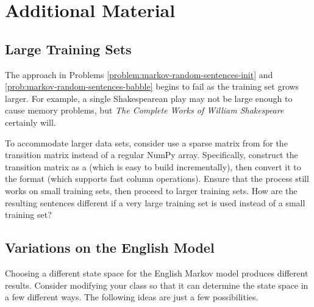 \newpage

\section*{Additional Material} %

\subsection*{Large Training Sets} %

The approach in Problems \ref{problem:markov-random-sentences-init} and \ref{prob:markov-random-sentences-babble} begins to fail as the training set grows larger.
For example, a single Shakespearean play may not be large enough to cause memory problems, but \emph{The Complete Works of William Shakespeare} certainly will.

To accommodate larger data sets, consider use a sparse matrix from  for the transition matrix instead of a regular NumPy array.
Specifically, construct the transition matrix as a  (which is easy to build incrementally), then convert it to the  format (which supports fast column operations).
Ensure that the process still works on small training sets, then proceed to larger training sets.
How are the resulting sentences different if a very large training set is used instead of a small training set?

\subsection*{Variations on the English Model} %

Choosing a different state space for the English Markov model produces different results.
Consider modifying your  class so that it can determine the state space in a few different ways.
The following ideas are just a few possibilities.


